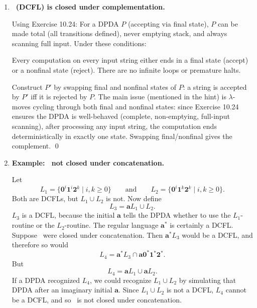 \begin{enumerate}[{10.}1. ]
\begin{enumerate}
\item \textbf{Total transitions}: Now fill in whatever cases remain undefined, but in a way that respects the DPDA rules. If for some pair $(q,X)$ there is already a $\lambda$-move, then no input move may be added there; the existing $\lambda$-move already supplies the unique next step. If there is no $\lambda$-move for $(q,X)$, then for each missing input symbol add a transition to $q_{\mathrm{rej}}$ that preserves the stack. If neither input moves nor a $\lambda$-move existed for $(q,X)$, add the single $\lambda$-move to $q_{\mathrm{rej}}$. Thus every reachable configuration has a next move, and no input/$\lambda$ conflict is introduced.

These three repairs preserve the accepted language and keep the machine deterministic, so the resulting DPDA has all the required properties. \qed
\end{enumerate}

\item \textbf{\ASIG\ (DCFL) is closed under complementation.}

Using Exercise 10.24: For a DPDA $P$ (accepting via final state), $P$ can be made total (all transitions defined), never emptying stack, and always scanning full input. Under these conditions:

Every computation on every input string either ends in a final state (accept) or a nonfinal state (reject). There are no infinite loops or premature halts.

Construct $P'$ by swapping final and nonfinal states of $P$: a string is accepted by $P'$ iff it is rejected by $P$. The main issue (mentioned in the hint) is $\lambda$-moves cycling through both final and nonfinal states: since Exercise 10.24 ensures the DPDA is well-behaved (complete, non-emptying, full-input scanning), after processing any input string, the computation ends deterministically in exactly one state. Swapping final/nonfinal gives the complement. \qed

\item \textbf{Example: \ASIG\ not closed under concatenation.}

Let
\[
L_1=\{\pmb{0}^i\pmb{1}^i\pmb{2}^k\mid i,k\geq 0\}
\qquad\text{and}\qquad
L_2=\{\pmb{0}^i\pmb{1}^k\pmb{2}^k\mid i,k\geq 0\}.
\]
Both are DCFLs, but $L_1\cup L_2$ is not. Now define
\[
L_3=\pmb{a}L_1\cup L_2.
\]
$L_3$ is a DCFL, because the initial $\pmb{a}$ tells the DPDA whether to use the $L_1$-routine or the $L_2$-routine. The regular language $\pmb{a}^*$ is certainly a DCFL. Suppose \ASIG\ were closed under concatenation. Then $\pmb{a}^*L_3$ would be a DCFL, and therefore so would
\[
L_4=\pmb{a}^*L_3\cap \pmb{a}\pmb{0}^*\pmb{1}^*\pmb{2}^*.
\]
But
\[
L_4=\pmb{a}L_1\cup \pmb{a}L_2.
\]
If a DPDA recognized $L_4$, we could recognize $L_1\cup L_2$ by simulating that DPDA after an imaginary initial $\pmb{a}$. Since $L_1\cup L_2$ is not a DCFL, $L_4$ cannot be a DCFL, and so \ASIG\ is not closed under concatenation.


\end{enumerate}
